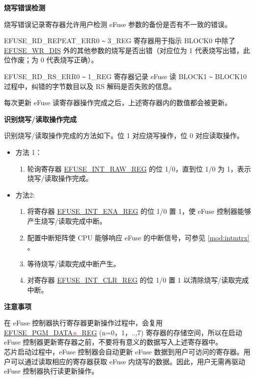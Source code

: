 \documentclass[main\_\_CN.tex]{subfiles}
\begin{document}
{\bfseries 烧写错误检测}

烧写错误记录寄存器允许用户检测 eFuse 参数的备份是否有不一致的错误。

EFUSE\_RD\_REPEAT\_ERR0 \verb+~+ 3\_REG 寄存器用于指示 BLOCK0 中除了 \hyperref[fielddesc:EFUSEWRDIS]{EFUSE\_WR\_DIS} 外的其他参数的烧写是否出错（对应位为 1 代表烧写出错，此位作废；为 0 代表烧写正确）。

EFUSE\_RD\_RS\_ERR0 \verb+~+ 1\_REG 寄存器记录 eFuse 读 BLOCK1 \verb+~+ BLOCK10 过程中，纠错的字节数目以及 RS 解码是否失败的信息。

每次更新 eFuse 读寄存器操作完成之后，上述寄存器内的数值都会被更新。

{\bfseries 识别烧写/读取操作完成}

识别烧写/读取操作完成的方法如下。位 1 对应烧写操作，位 0 对应读取操作。
\begin{itemize}

    \item 方法 1：
        \begin{enumerate}
            \item 轮询寄存器 \hyperref[regdesc:EFUSEINTRAWREG]{EFUSE\_INT\_RAW\_REG} 的位 1/0，直到位 1/0 为 1，表示烧写/读取操作完成。
        \end{enumerate}
    \item 方法2:
        \begin{enumerate}
            \item 将寄存器 \hyperref[regdesc:EFUSEINTENAREG]{EFUSE\_INT\_ENA\_REG} 的位 1/0 置 1，使 eFuse 控制器能够产生烧写/读取完成中断。
            \item 配置中断矩阵使 CPU 能够响应 eFuse 的中断信号，可参见 \ref{mod:intmtrx} \textit{}。

            \item 等待烧写/读取完成中断产生。

            \item 对寄存器 \hyperref[regdesc:EFUSEINTCLRREG]{EFUSE\_INT\_CLR\_REG} 的位 1/0 置 1 以清除烧写/读取完成中断。
    \end{enumerate}
\end{itemize}

{\bfseries 注意事项}

在 eFuse 控制器执行寄存器更新操作过程中，会复用 \hyperref[regdesc:EFUSEPGMDATA0REG]{EFUSE\_PGM\_DATA\textcolor{red}{\it{n}}\_REG} (n=0，1，..,7) 寄存器的存储空间，所以在启动 eFuse 控制器更新寄存器之前，不要将有意义的数据写入上述寄存器中。\\
芯片启动过程中，eFuse 控制器会自动更新 eFuse 数据到用户可访问的寄存器。用户可以通过读取相应的寄存器获取 eFuse 内烧写的数据。因此，用户无需再驱动 eFuse 控制器执行读更新操作。
\end{document}
